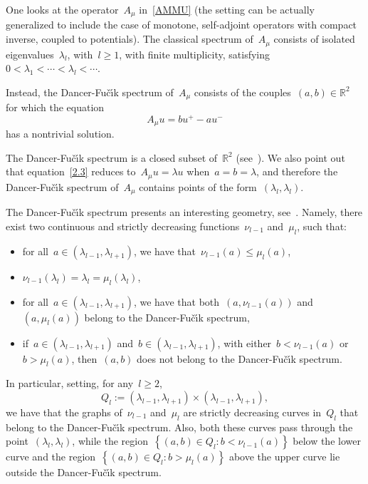 \documentclass[12pt,a4paper,intlimits,sumlimits]{amsart}
\def \R {\mathbb{R}}
\newcommand{\Fucik}{Fu\v c\'\i k }
\newcommand{\set}[1]{\left\{#1\right\}}
\theoremstyle{definition}
\theoremstyle{plain}
\numberwithin{equation}{section}
\renewcommand{\le}{\leqslant}
\renewcommand{\ge}{\geqslant}
\begin{document}
One looks at the  operator~$A_\mu$ in~\eqref{AMMU}
(the setting can be actually generalized to include the case of monotone, self-adjoint operators with compact inverse, coupled to potentials).
The classical spectrum of~$A_\mu$ consists of isolated eigenvalues~$\lambda_l$, with~$ l \ge 1$, with finite multiplicity, satisfying~$0 < \lambda_1 < \cdots < \lambda_l < \cdots$. 

Instead, the Dancer-\Fucik spectrum of~$A_\mu$
consists of the couples~$(a,b) \in \R^2$ for which the equation
\begin{equation} \label{2.3}
A_\mu u = bu^+ - au^-
\end{equation}
has a nontrivial solution.

The Dancer-\Fucik spectrum is a closed subset of~$\R^2$ (see~\cite[Proposition 4.4.3]{MR3012848}).
We also point out that equation~\eqref{2.3} reduces to~$A_\mu u = \lambda u$ when~$a = b = \lambda$, and therefore the Dancer-\Fucik spectrum of~$A_\mu$ contains
points of the form~$(\lambda_l,\lambda_l)$.

The Dancer-\Fucik spectrum presents an interesting geometry, see~\cite[Theorem 4.7.9]{MR3012848}.
Namely, there exist two continuous and strictly decreasing functions~$\nu_{l-1}$
and~$\mu_l$, such that:
\begin{itemize}
\item for all~$a\in(\lambda_{l-1},\lambda_{l+1})$, we have that~$\nu_{l-1}(a)\le\mu_l(a)$,
\item $\nu_{l-1}(\lambda_l) = \lambda_l=\mu_l(\lambda_l)$,
\item for all~$a\in(\lambda_{l-1},\lambda_{l+1})$, we have that both~$(a,\nu_{l-1}(a))$ and~$(a,\mu_{l}(a))$
belong to the Dancer-\Fucik spectrum,
\item if~$a\in(\lambda_{l-1},\lambda_{l+1})$ and~$b\in (\lambda_{l-1},\lambda_{l+1})$,
with either~$b < \nu_{l-1}(a)$ or~$b > \mu_l(a)$, then~$(a,b)$ does not belong to the Dancer-\Fucik spectrum.
\end{itemize}

In particular, setting, for any~$ l \ge 2$,
\begin{equation}\label{QELL}
Q_l := (\lambda_{l-1},\lambda_{l+1}) \times (\lambda_{l-1},\lambda_{l+1}),
\end{equation}
we have that the graphs of~$\nu_{l-1}$ and~$\mu_l$
are strictly decreasing curves in~$Q_l$ that belong to the Dancer-\Fucik spectrum.
Also, both these curves pass through the point~$(\lambda_l,\lambda_l)$, while the region~$\set{(a,b) \in Q_l : b < \nu_{l-1}(a)}$ below the lower curve and the region~$\set{(a,b) \in Q_l : b > \mu_l(a)}$ above the upper curve lie outside the Dancer-\Fucik spectrum.
\end{document}

